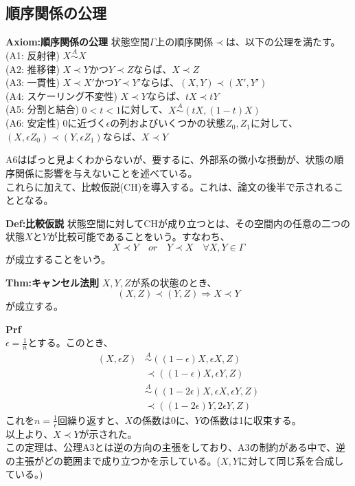 \documentclass[a4paper,11pt]{jsarticle}
\begin{document}
\subsection{順序関係の公理}
\begin{itembox}[l]{\textbf{Axiom:順序関係の公理}}
    状態空間$\Gamma$上の順序関係$\prec$は、以下の公理を満たす。\\
    (A1: 反射律) $ X \overset{A}{\sim} X$\\
    (A2: 推移律) $X \prec Y$かつ$Y \prec Z$ならば、$X \prec Z$\\
    (A3: 一貫性) $X \prec X'$かつ$Y \prec Y'$ならば、$(X,Y) \prec (X',Y')$\\
    (A4: スケーリング不変性) $X \prec Y$ならば、$tX \prec tY$\\
    (A5: 分割と結合) $0<t<1$に対して、$X \overset{A}{\sim} (tX,(1-t)X)$\\
    (A6: 安定性) 0に近づく$\epsilon$の列およびいくつかの状態$Z_0,Z_1$に対して、$(X,\epsilon Z_0) \prec (Y,\epsilon Z_1)$ならば、$X \prec Y$ 
\end{itembox}
A6はぱっと見よくわからないが、要するに、外部系の微小な摂動が、状態の順序関係に影響を与えないことを述べている。\\
これらに加えて、比較仮説(CH)を導入する。これは、論文の後半で示されることとなる。\\
\begin{itembox}[l]{\textbf{Def:比較仮説}}
    状態空間に対してCHが成り立つとは、その空間内の任意の二つの状態$X$と$Y$が比較可能であることをいう。すなわち、
    \begin{equation}
        X \prec Y \quad or \quad Y \prec X \quad \forall X,Y \in \Gamma
    \end{equation}
    が成立することをいう。

\end{itembox}

\begin{itembox}[l]{\textbf{Thm:キャンセル法則}}
    $X,Y,Z$が系の状態のとき、
    \begin{equation}
        (X,Z) \prec (Y,Z) \Rightarrow X \prec Y
    \end{equation}
    が成立する。

\end{itembox}
\textbf{Prf}\\
$\epsilon =\frac{1}{n}$とする。このとき、
\begin{align}
    (X,\epsilon Z) &\overset{A}{\sim} ((1-\epsilon)X,\epsilon X,Z)\\
    &\prec ((1-\epsilon)X,\epsilon Y,Z)\\
    &\overset{A}{\sim} ((1-2\epsilon)X,\epsilon X,\epsilon Y,Z)\\
    &\prec ((1-2\epsilon)Y,2\epsilon Y,Z)
    \end{align}
これを$n=\frac{1}{\epsilon}$回繰り返すと、$X$の係数は0に、$Y$の係数は1に収束する。\\
以上より、$X \prec Y$が示された。\hfill\qedsymbol\\
この定理は、公理A3とは逆の方向の主張をしており、A3の制約がある中で、逆の主張がどの範囲まで成り立つかを示している。($X,Y$に対して同じ系を合成している。)
\end{document}
